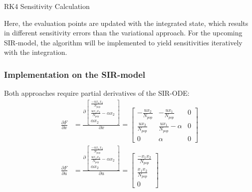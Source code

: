 \begin{algorithm}[H]
\SetAlgoLined
{}
 \caption{RK4 Sensitivity Calculation}
 \label{alg:RK4_sense}
\end{algorithm}

Here, the evaluation points are updated with the integrated state, which results in different sensitivity errors than the variational approach. For the upcoming SIR-model, the algorithm will be implemented to yield sensitivities iteratively with the integration.

\subsubsection{Implementation on the SIR-model}
Both approaches require partial derivatives of the SIR-ODE:
\begin{align}
    \frac{\partial F}{\partial x} &= \frac{\partial 
    \begin{bmatrix}
    \frac{-u x_1 x_2}{N_{pop}}\\
    \frac{u x_1x_2}{N_{pop}} - \alpha x_2\\
    \alpha x_2
    \end{bmatrix}
    }{\partial x} = \begin{bmatrix}
    -\frac{ux_2}{N_{pop}} & -\frac{ux_1}{N_{pop}} & 0\\
    \frac{ux_2}{N_{pop}} & \frac{ux_1}{N_{pop}} - \alpha & 0\\
    0 & \alpha & 0
    \end{bmatrix}
    \label{eq:dFdx_SIR}\\
    \frac{\partial F}{\partial u} &= \frac{\partial 
    \begin{bmatrix}
    \frac{-u x_1 x_2}{N_{pop}}\\
    \frac{u x_1 x_2}{N_{pop}} - \alpha x_2\\
    \alpha x_2
    \end{bmatrix}
    }{\partial u} = 
    \begin{bmatrix}
    \frac{-x_1 x_2}{N_{pop}}\\
    \frac{x_1 x_2}{N_{pop}}\\
    0
    \end{bmatrix}
    \label{eq:dFdu_SIR}
\end{align}


